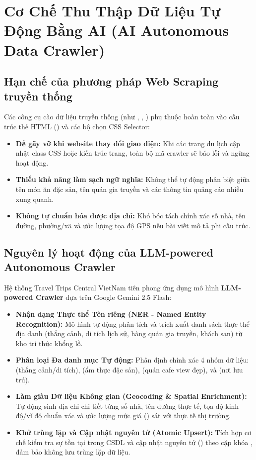 \section{Cơ Chế Thu Thập Dữ Liệu Tự Động Bằng AI (AI Autonomous Data Crawler)}

\subsection{Hạn chế của phương pháp Web Scraping truyền thống}
Các công cụ cào dữ liệu truyền thống (như , , ) phụ thuộc hoàn toàn vào cấu trúc thẻ HTML () và các bộ chọn CSS Selector:
\begin{itemize}
    \item \textbf{Dễ gãy vỡ khi website thay đổi giao diện:} Khi các trang du lịch cập nhật class CSS hoặc kiến trúc trang, toàn bộ mã crawler sẽ báo lỗi và ngừng hoạt động.
    \item \textbf{Thiếu khả năng làm sạch ngữ nghĩa:} Không thể tự động phân biệt giữa tên món ăn đặc sản, tên quán gia truyền và các thông tin quảng cáo nhiễu xung quanh.
    \item \textbf{Không tự chuẩn hóa được địa chỉ:} Khó bóc tách chính xác số nhà, tên đường, phường/xã và ước lượng tọa độ GPS nếu bài viết mô tả phi cấu trúc.
\end{itemize}

\subsection{Nguyên lý hoạt động của LLM-powered Autonomous Crawler}
Hệ thống Travel Trips Central VietNam tiên phong ứng dụng mô hình \textbf{LLM-powered Crawler} dựa trên Google Gemini 2.5 Flash:
\begin{itemize}
    \item \textbf{Nhận dạng Thực thể Tên riêng (NER - Named Entity Recognition):} Mô hình tự động phân tích và trích xuất danh sách thực thể địa danh (thắng cảnh, di tích lịch sử, hàng quán gia truyền, khách sạn) từ kho tri thức khổng lồ.
    \item \textbf{Phân loại Đa danh mục Tự động:} Phân định chính xác 4 nhóm dữ liệu:  (thắng cảnh/di tích),  (ẩm thực đặc sản),  (quán cafe view đẹp), và  (nơi lưu trú).
    \item \textbf{Làm giàu Dữ liệu Không gian (Geocoding \& Spatial Enrichment):} Tự động sinh địa chỉ chi tiết từng số nhà, tên đường thực tế, tọa độ kinh độ/vĩ độ chuẩn xác và ước lượng mức giá () sát với thực tế thị trường.
    \item \textbf{Khử trùng lặp và Cập nhật nguyên tử (Atomic Upsert):} Tích hợp cơ chế kiểm tra sự tồn tại trong CSDL và cập nhật nguyên tử () theo cặp khóa , đảm bảo không lưu trùng lặp dữ liệu.
\end{itemize}

